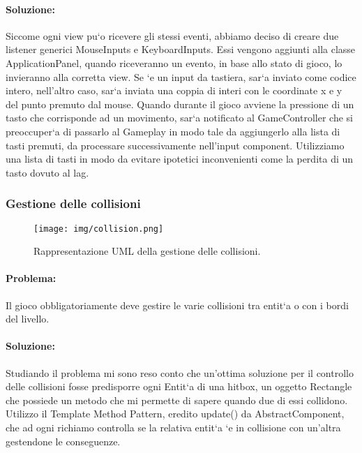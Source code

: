 \paragraph{Soluzione:}
Siccome ogni view pu`o ricevere gli stessi eventi, abbiamo deciso di creare due listener generici MouseInputs e KeyboardInputs. Essi vengono aggiunti alla classe ApplicationPanel, quando riceveranno un evento, in base allo stato di gioco, lo invieranno alla corretta view. Se `e un input da tastiera, sar`a inviato come codice intero, nell’altro caso, sar`a inviata una coppia di interi con le coordinate x e y del punto premuto dal mouse. Quando durante il gioco avviene la pressione di un tasto che corrisponde ad un movimento, sar`a notificato al GameController che si preoccuper`a di passarlo al Gameplay in modo tale da aggiungerlo alla lista di tasti premuti, da processare successivamente nell’input component. Utilizziamo una lista di tasti in modo da evitare ipotetici inconvenienti come la perdita di un tasto dovuto al lag.

\subsubsection{Gestione delle collisioni}

\begin{figure}[H]
\centering{}
\texttt{[image: img/collision.png]}
\caption{Rappresentazione UML della gestione delle collisioni.}
\end{figure}

\paragraph{Problema:}
Il gioco obbligatoriamente deve gestire le varie collisioni tra entit`a o con i bordi del livello.

\paragraph{Soluzione:}
Studiando il problema mi sono reso conto che un’ottima soluzione per il controllo delle collisioni fosse predisporre ogni Entit`a di una hitbox, un oggetto Rectangle che possiede un metodo che mi permette di sapere quando due di essi collidono. Utilizzo il Template Method Pattern, eredito update() da AbstractComponent, che ad ogni richiamo controlla se la relativa entit`a `e in collisione con un’altra gestendone le conseguenze.






